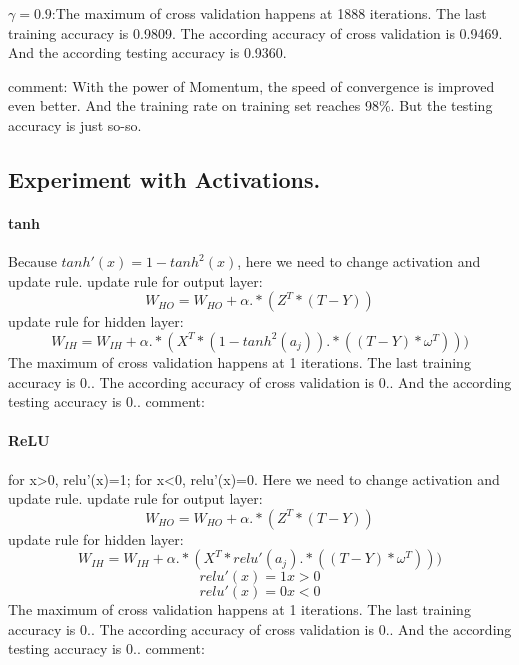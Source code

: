 \documentclass{article} %
\begin{document}
	$\gamma= 0.9$:The maximum of cross validation happens at 1888 iterations. The last training accuracy is 0.9809. The according accuracy of cross validation is 0.9469. And the according testing accuracy is 0.9360.

	comment: With the power of Momentum, the speed of convergence is improved even better. And the training rate on training set reaches 98\%. But the testing accuracy is just so-so.


	\subsection{Experiment with Activations.}
	\paragraph{tanh}
	Because $tanh'(x)=1-tanh^2(x)$, here we need to change activation and update rule.
	update rule for output layer:
		\begin{equation*}
		W_{HO} = W_{HO}  + \alpha .* (Z^T * (T - Y) )
		\end{equation*}
	update rule for hidden layer:
		\begin{equation*}
		W_{IH} = W_{IH}  + \alpha .* (X^T * (1-tanh^2(a_j)).*((T-Y)*\omega^T)))
		\end{equation*}
	The maximum of cross validation happens at 1 iterations. The last training accuracy is 0.. The according accuracy of cross validation is 0.. And the according testing accuracy is 0..
	comment:

	\paragraph{ReLU}
	for x>0, relu'(x)=1; for x<0, relu'(x)=0. Here we need to change activation and update rule.
	update rule for output layer:
		\begin{equation*}
		W_{HO} = W_{HO}  + \alpha .* (Z^T * (T - Y) )
		\end{equation*}
	update rule for hidden layer:
		\begin{equation*}
		W_{IH} = W_{IH}  + \alpha .* (X^T * relu'(a_j).*((T-Y)*\omega^T)))
		\end{equation*}
		\begin{equation*}
		relu'(x)=1 { }x>0
		\end{equation*}
		\begin{equation*}
		relu'(x)=0 { }x<0
		\end{equation*}
	The maximum of cross validation happens at 1 iterations. The last training accuracy is 0.. The according accuracy of cross validation is 0.. And the according testing accuracy is 0..
	comment:
\end{document}
